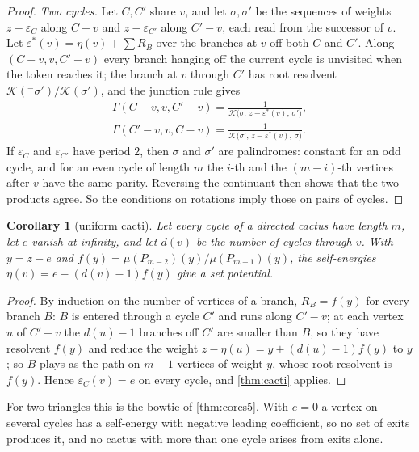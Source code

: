 \documentclass[11pt]{amsart}
\theoremstyle{plain}
\newtheorem{corollary}[theorem]{Corollary}
\theoremstyle{definition}
\theoremstyle{remark}
\numberwithin{equation}{section}
\newcommand{\cont}{\mathcal{K}}           %
\begin{document}
\begin{proof}
\emph{Two cycles.} Let $C,C'$ share $v$, and let $\sigma,\sigma'$ be the sequences of weights $z-\varepsilon_C$ along $C-v$ and $z-\varepsilon_{C'}$ along $C'-v$, each read from the successor of $v$. Let $\varepsilon^{*}(v)=\eta(v)+\sum R_B$ over the branches at $v$ off both $C$ and $C'$. Along $(C-v,v,C'-v)$ every branch hanging off the current cycle is unvisited when the token reaches it; the branch at $v$ through $C'$ has root resolvent $\cont({}^{-}\sigma')/\cont(\sigma')$, and the junction rule gives
\begin{gather*}
\Gamma(C-v,v,C'-v)=\frac{1}{\cont\bigl(\sigma,\,z-\varepsilon^{*}(v),\,\sigma'\bigr)},\\
\Gamma(C'-v,v,C-v)=\frac{1}{\cont\bigl(\sigma',\,z-\varepsilon^{*}(v),\,\sigma\bigr)}.
\end{gather*}
If $\varepsilon_C$ and $\varepsilon_{C'}$ have period $2$, then $\sigma$ and $\sigma'$ are palindromes: constant for an odd cycle, and for an even cycle of length $m$ the $i$-th and the $(m-i)$-th vertices after $v$ have the same parity. Reversing the continuant then shows that the two products agree. So the conditions on rotations imply those on pairs of cycles.
\end{proof}

\begin{corollary}[uniform cacti]\label{cor:uniform-cacti}
Let every cycle of a directed cactus have length $m$, let $e$ vanish at infinity, and let $d(v)$ be the number of cycles through $v$. With $y=z-e$ and $f(y)=\mu(P_{m-2})(y)/\mu(P_{m-1})(y)$, the self-energies $\eta(v)=e-(d(v)-1)f(y)$ give a set potential.
\end{corollary}
\begin{proof}
By induction on the number of vertices of a branch, $R_B=f(y)$ for every branch $B$: $B$ is entered through a cycle $C'$ and runs along $C'-v$; at each vertex $u$ of $C'-v$ the $d(u)-1$ branches off $C'$ are smaller than $B$, so they have resolvent $f(y)$ and reduce the weight $z-\eta(u)=y+(d(u)-1)f(y)$ to $y$; so $B$ plays as the path on $m-1$ vertices of weight $y$, whose root resolvent is $f(y)$. Hence $\varepsilon_C(v)=e$ on every cycle, and \cref{thm:cacti} applies.
\end{proof}

For two triangles this is the bowtie of \cref{thm:cores5}. With $e=0$ a vertex on several cycles has a self-energy with negative leading coefficient, so no set of exits produces it, and no cactus with more than one cycle arises from exits alone.
\end{document}
